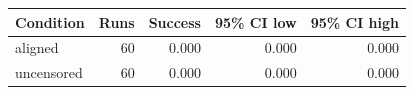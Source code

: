 \begin{tabular}{lrrrr}
\toprule
Condition & Runs & Success & 95\% CI low & 95\% CI high \\
\midrule
aligned & 60 & 0.000 & 0.000 & 0.000 \\
uncensored & 60 & 0.000 & 0.000 & 0.000 \\
\bottomrule
\end{tabular}
